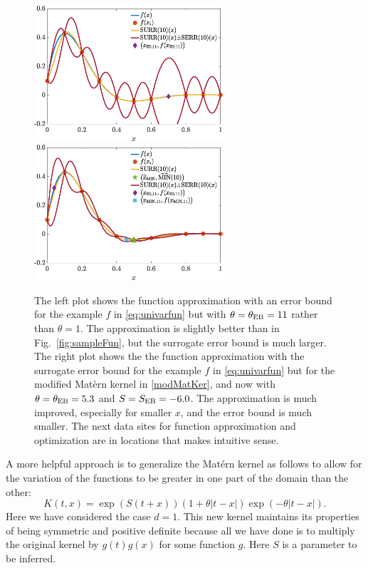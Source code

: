\documentclass[11pt]{NSFamsart}
\def\abs#1{\ensuremath{\left \lvert #1 \right \rvert}}
\begin{document}
\begin{figure}
    \centering
    \includegraphics[width = 7cm]{ProgramsImages/fandDataAndAppxAndRMSPEOpt.eps} \qquad \qquad
    \includegraphics[width = 7cm]{ProgramsImages/fandDataAndAppxAndRMSPEOpty.eps}
    \caption{The left plot shows the function approximation with an error bound for the example $f$ in \eqref{eq:univarfun} but with $\theta = \theta_{\textup{EB}} = 11$ rather than $\theta =1$.  The approximation is slightly better than in Fig.\ \ref{fig:sampleFun}, but the surrogate error bound is much larger.  The right plot shows the the function approximation with the surrogate error bound for the example $f$ in \eqref{eq:univarfun} but for the modified Mat\`ern kernel in \eqref{modMatKer}, and now with $\theta = \theta_{\textup{EB}} = 5.3$ and $S = S_{\textup{EB}} = -6.0$.  The approximation is much improved, especially for smaller $x$, and the error bound is much smaller.  The next data sites for function approximation and optimization are in locations that makes intuitive sense.}
    \label{fig:InferKernel}
\end{figure}

A more helpful approach is to generalize the Mat\'ern kernel as follows to allow for the variation of the functions to be greater in one part of the domain than the other:
\begin{equation} \label{modMatKer}
    K(t,x) = \exp(S(t+x))(1 + \theta \abs{t-x}) \exp(-\theta\abs{t-x}).
\end{equation}
Here we have considered the case $d=1$.  This new kernel maintains its properties of being symmetric and positive definite because all we have done is to multiply the original kernel by $g(t)g(x)$ for some function $g$.  Here $S$ is a parameter to be inferred.
\end{document}
